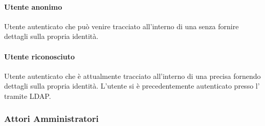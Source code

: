 \paragraph{Utente anonimo}
Utente autenticato che può venire tracciato all'interno di una  senza fornire dettagli sulla propria identità.
\paragraph{Utente riconosciuto}
Utente autenticato che è attualmente tracciato all'interno di una precisa  fornendo dettagli sulla propria identità.
L'utente si è precedentemente autenticato presso l' tramite LDAP.

\subsubsection{Attori Amministratori}
